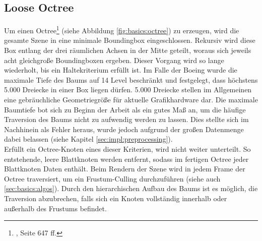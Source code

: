 \subsection{Loose Octree}
\label{sec:basics:octree}
Um einen Octree\footnote{\cite{RTR3}, Seite 647 ff.} (siehe Abbildung \ref{fig:basics:octree}) zu erzeugen, wird die gesamte Szene in eine minimale Boundingbox eingeschlossen. Rekursiv wird diese Box entlang der drei räumlichen Achsen in der Mitte geteilt, woraus sich jeweils acht gleichgroße Boundingboxen ergeben. Dieser Vorgang wird so lange wiederholt, bis ein Haltekriterium erfüllt ist. Im Falle der Boeing wurde die maximale Tiefe des Baums auf 14 Level beschränkt und festgelegt, dass höchstens 5.000 Dreiecke in einer Box liegen dürfen. 5.000 Dreiecke stellen im Allgemeinen eine gebräuchliche Geometriegröße für aktuelle Grafikhardware dar. Die maximale Baumtiefe bot sich zu Beginn der Arbeit als ein gutes Maß an, um die häufige Traversion des Baums nicht zu aufwendig werden zu lassen. Dies stellte sich im Nachhinein als Fehler heraus, wurde jedoch aufgrund der großen Datenmenge dabei belassen (siehe Kapitel \ref{sec:impl:preprocessing}).\\
Erfüllt ein Octree-Knoten eines dieser Kriterien, wird nicht weiter unterteilt. So entstehende, leere Blattknoten werden entfernt, sodass im fertigen Octree jeder Blattknoten Daten enthält. Beim Rendern der Szene wird in jedem Frame der Octree traversiert, um ein Frustum-Culling durchzuführen (siehe auch \ref{sec:basics:algos}). Durch den hierarchischen Aufbau des Baums ist es möglich, die Traversion abzubrechen, falls sich ein Knoten vollständig innerhalb oder außerhalb des Frustums befindet.

